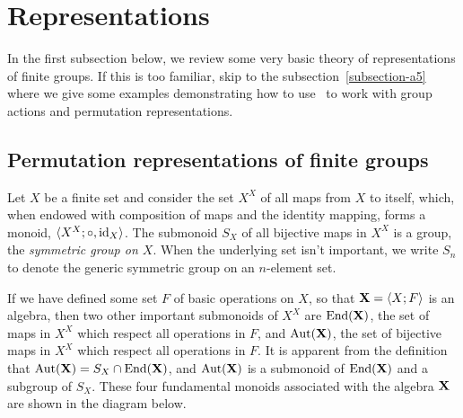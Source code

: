 \section{Representations}
In the first subsection below, we review some very basic theory of representations of
finite groups.  If this is too familiar, skip to the
subsection~\ref{subsection-a5}
where we give some examples demonstrating how to use \gap\ to work with
group actions and permutation representations.
\subsection{Permutation representations of finite groups}
Let $X$ be a finite set and consider the set $X^X$ of all maps from $X$ to
itself, which, when endowed with composition of maps and the identity mapping,
forms a monoid, $\langle X^X; \circ, \mathrm{id}_{X}\rangle$.  The submonoid $S_X$ of all bijective
maps in $X^X$ is a group, the \emph{symmetric group on $X$}.  When the
underlying set isn't important, we write $S_n$ to denote the generic
symmetric group on an $n$-element set. 

If we have defined some set $F$ of basic operations on $X$, so that
$\mathbf{X} = \langle X; F\rangle$ is an algebra, then two other important submonoids of
$X^X$ are $\mathrm{End}(\mathbf{X})$, the set of maps in $X^X$ which respect all 
operations in $F$, and $\mathrm{Aut}(\mathbf{X})$, the set of bijective maps in  $X^X$ which
respect all operations in $F$.  It is apparent from the definition that
 $\mathrm{Aut}(\mathbf{X})= S_X \cap \mathrm{End}(\mathbf{X})$, and  $\mathrm{Aut}(\mathbf{X})$ is a submonoid of $\mathrm{End}(\mathbf{X})$
 and a subgroup of $S_X$.  These four fundamental monoids
 associated with the algebra $\mathbf{X}$ are shown in the diagram below. 

\begin{center}
\end{center}



